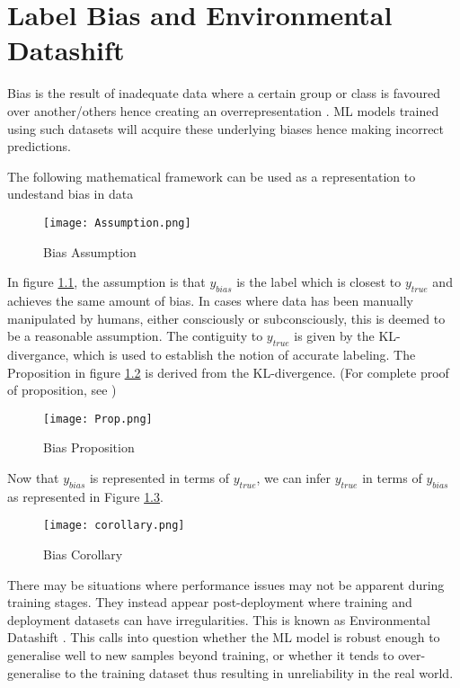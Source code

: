 \chapter{Label Bias and Environmental Datashift}
Bias is the result of inadequate data where a certain group or class is favoured over another/others hence creating an overrepresentation \cite{Jiang}\cite{saria2019tutorial}.
ML models trained using such datasets will acquire these underlying biases hence making incorrect predictions.

The following mathematical framework can be used as a representation to undestand bias in data \cite{Jiang}

\begin{figure}[h]
    \texttt{[image: Assumption.png]}
    \centering
    \caption{Bias Assumption \cite{Jiang}}
    \label{fig:Assumption}
\end{figure}

In figure \ref{fig:Assumption}, the assumption is that $y_{bias}$ is the label which is closest to $y_{true}$ and achieves the same amount of bias.
In cases where data has been manually manipulated by humans, either consciously or subconsciously, this is deemed to be a reasonable assumption.
The contiguity to $y_{true}$ is given by the KL-divergance, which is used to establish the notion of accurate labeling. 
The Proposition in figure \ref{fig:Proposition} is derived from the KL-divergence. (For complete proof of proposition, see \cite{Jiang})

\begin{figure}[h]
    \texttt{[image: Prop.png]}
    \centering
    \caption{Bias Proposition \cite{Jiang}}
    \label{fig:Proposition}
\end{figure}

Now that $y_{bias}$ is represented in terms of $y_{true}$, we can infer $y_{true}$ in terms of $y_{bias}$ as represented in Figure \ref{fig:Corollary}.

\begin{figure}[h]
    \texttt{[image: corollary.png]}
    \centering
    \caption{Bias Corollary \cite{Jiang}}
    \label{fig:Corollary}
\end{figure}

There may be situations where performance issues may not be apparent during training stages. 
They instead appear post-deployment where training and deployment datasets can have irregularities. 
This is known as Environmental Datashift \cite{saria2019tutorial}. 
This calls into question whether the ML model is robust enough to generalise well to new samples beyond training, or whether it tends to over-generalise to the training dataset thus resulting in unreliability in the real world.


